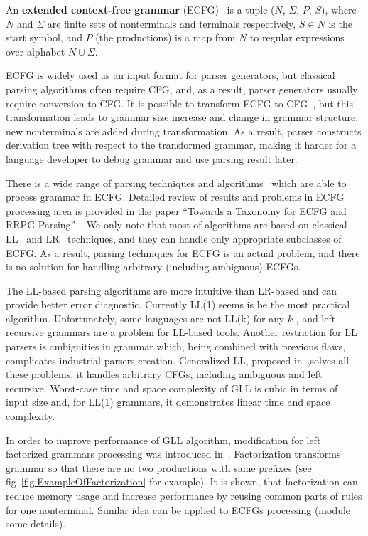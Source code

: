 \documentclass[runningheads,a4paper]{llncs}
\begin{document}
\begin{mydef}
An \textbf{extended context-free grammar} (ECFG)~\cite{ECFG} is a tuple ($N$, $\Sigma$, $P$, $S$), where $N$
and $\Sigma$ are finite sets of nonterminals and terminals respectively, $ S\in N$ is the start symbol,
and $P$ (the productions) is a map from $N$ to regular expressions over alphabet $N \cup \Sigma$.
\end{mydef}

ECFG is widely used as an input format for parser generators, but classical parsing algorithms often require CFG, and, as a result, parser generators usually require conversion to CFG.
It is possible to transform ECFG to CFG~\cite{ELL}, but this transformation leads to grammar size 
increase and change in grammar structure: new nonterminals are added during transformation.
As a result, parser constructs derivation tree with respect to the transformed grammar, making it harder for a language developer to debug grammar and use parsing result later.

There is a wide range of parsing techniques and algorithms~\cite{AttributedELL,ELRR,ECFGparsing,ELLParser,ELL,ECFG,ELALR,ELRParsing} which are able to process grammar in ECFG.
Detailed review of results and problems in ECFG processing area is provided in the paper ``Towards a Taxonomy for ECFG and RRPG Parsing''~\cite{ECFG}. 
We only note that most of algorithms are based on classical LL~\cite{ELLParser,AttributedELL,PredictiveECFG} and LR~\cite{ELRParsing,ELALR,ELRR} techniques, and they can handle only appropriate subclasses of ECFG.
As a result, parsing techniques for ECFG is an actual problem, and there is no solution for handling arbitrary (including ambiguous) ECFGs.

The LL-based parsing algorithms are more intuitive than LR-based and can provide better error diagnostic.
Currently LL(1) seems is be the most practical algorithm.
Unfortunately, some languages are not LL(k) for any $k$ , and left recursive grammars are a problem for LL-based tools.
Another restriction for LL parsers is ambiguities in grammar which, being combined with previous flaws, complicates industrial parsers creation.
Generalized LL, proposed in~\cite{scott2010gll},solves all these problems: it handles arbitrary CFGs, including ambiguous and left recursive.  
Worst-case time and space complexity of GLL is cubic in terms of input size and, for LL(1) grammars, it demonstrates linear time and space complexity.

In order to improve performance of GLL algorithm, modification for left factorized grammars processing was introduced in~\cite{scott2016structuring}.
Factorization transforms grammar so that there are no two productions with same prefixes (see fig~\ref{fig:ExampleOfFactorization} for example).
It is shown, that factorization can reduce memory usage and increase performance by reusing common parts of rules for one nonterminal.
Similar idea can be applied to ECFGs processing (module some details).
\end{document}
